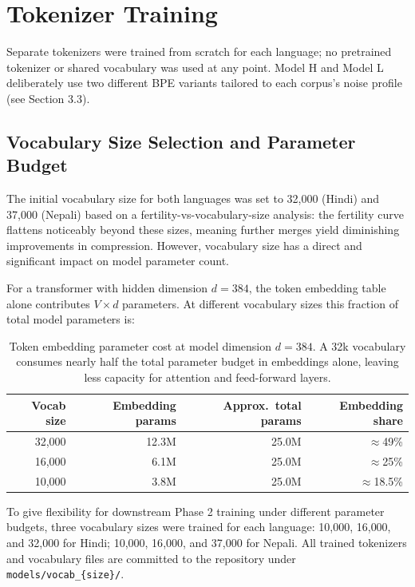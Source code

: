 \documentclass[11pt]{article}
\begin{document}
\section{Tokenizer Training}

Separate tokenizers were trained from scratch for each language; no pretrained tokenizer or shared vocabulary was used at any point. Model H and Model L deliberately use two different BPE variants tailored to each corpus's noise profile (see Section 3.3).

\subsection{Vocabulary Size Selection and Parameter Budget}

The initial vocabulary size for both languages was set to 32{,}000 (Hindi) and 37{,}000 (Nepali) based on a fertility-vs-vocabulary-size analysis: the fertility curve flattens noticeably beyond these sizes, meaning further merges yield diminishing improvements in compression. However, vocabulary size has a direct and significant impact on model parameter count.

For a transformer with hidden dimension $d = 384$, the token embedding table alone contributes $V \times d$ parameters. At different vocabulary sizes this fraction of total model parameters is:

\begin{table}[h]
\centering
\begin{tabular}{rrrr}
\toprule
\textbf{Vocab size} & \textbf{Embedding params} & \textbf{Approx.\ total params} & \textbf{Embedding share} \\
\midrule
32{,}000 & 12.3M & 25.0M & $\approx$49\% \\
16{,}000 & 6.1M & 25.0M & $\approx$25\% \\
10{,}000 & 3.8M & 25.0M & $\approx$18.5\% \\
\bottomrule
\end{tabular}
\caption{Token embedding parameter cost at model dimension $d=384$. A 32k vocabulary consumes nearly half the total parameter budget in embeddings alone, leaving less capacity for attention and feed-forward layers.}
\end{table}

To give flexibility for downstream Phase 2 training under different parameter budgets, three vocabulary sizes were trained for each language: 10{,}000, 16{,}000, and 32{,}000 for Hindi; 10{,}000, 16{,}000, and 37{,}000 for Nepali. All trained tokenizers and vocabulary files are committed to the repository under \texttt{models/vocab\_\{size\}/}.
\end{document}
